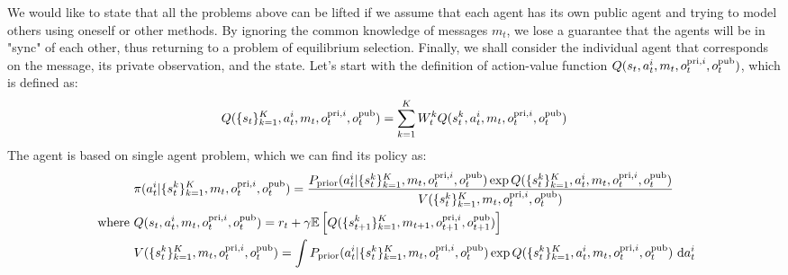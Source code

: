 We would like to state that all the problems above can be lifted if we assume that each agent has its own public agent and trying to model others using oneself or other methods. By ignoring the common knowledge of messages $m_t$, we lose a guarantee that the agents will be in "sync" of each other, thus returning to a problem of equilibrium selection. Finally, we shall consider the individual agent that corresponds on the message, its private observation, and the state. Let's start with the definition of action-value function $Q(s_t, a^i_t, m_t, o^{\operatorname{pri}, i}_t, o^{\operatorname{pub}}_t)$, which is defined as:
\begin{equation}
    Q(\{s_t\}^K_{k=1}, a^i_t, m_t, o^{\operatorname{pri}, i}_t, o^{\operatorname{pub}}_t) = \sum^K_{k=1} W^k_t Q(s_t^k, a^i_t, m_t, o^{\operatorname{pri}, i}_t, o^{\operatorname{pub}}_t)
\end{equation}
The agent is based on single agent problem, which we can find its policy as:
\begin{equation}
\begin{aligned}
    &\pi(a^i_t | \{s_t^k\}^K_{k=1}, m_t, o^{\operatorname{pri}, i}_t, o^{\operatorname{pub}}_t) = \frac{P_{\text{prior}}(a^i_t | \{s_t^k\}^K_{k=1}, m_t, o^{\operatorname{pri}, i}_t, o^{\operatorname{pub}}_t)\exp{Q(\{s_t^k\}^K_{k=1}, a^i_t, m_t, o^{\operatorname{pri}, i}_t, o^{\operatorname{pub}}_t)}}{V(\{s_t^k\}^K_{k=1}, m_t, o^{\operatorname{pri}, i}_t, o^{\operatorname{pub}}_t)} \\
    \text{ where }&Q(s_t, a^i_t, m_t, o^{\operatorname{pri}, i}_t, o^{\operatorname{pub}}_t) = r_t + \gamma\mathbb{E}\left[ Q(\{s_{t+1}^k\}^K_{k=1}, m_{t+1}, o^{\operatorname{pri}, i}_{t+1}, o^{\operatorname{pub}}_{t+1}) \right] \\
    &V(\{s_t^k\}^K_{k=1}, m_t, o^{\operatorname{pri}, i}_t, o^{\operatorname{pub}}_t) = \int P_{\text{prior}}(a^i_t | \{s_t^k\}^K_{k=1}, m_t, o^{\operatorname{pri}, i}_t, o^{\operatorname{pub}}_t)\exp{Q(\{s_t^k\}^K_{k=1}, a^i_t, m_t, o^{\operatorname{pri}, i}_t, o^{\operatorname{pub}}_t)} \ \mathrm{d} a^i_t
\end{aligned}
\end{equation}
